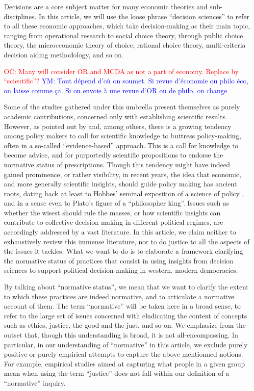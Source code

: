 \documentclass[preprint,11pt]{elsarticle}
\newcommand{\commentYM}[1]{\textcolor{blue}{YM: #1}}
\newcommand{\commentOC}[1]{\textcolor{red}{OC: #1}}
\begin{document}
\noindent Decisions are a core subject matter for many economic theories and sub-disciplines. In this article, we will use the loose phrase ``decision sciences'' to refer to all these economic approaches, which take decision-making as their main topic, ranging from operational research to social choice theory, through public choice theory, the microeconomic theory of choice, rational choice theory, multi-criteria decision aiding methodology, and so on.

\commentOC{Many will consider OR and MCDA as not a part of economy. Replace by “scientific”?}
\commentYM{Tout dépend d'où on soumet. Si revue d'économie ou philo éco, on laisse comme ça. Si on envoie à une revue d'OR ou de philo, on change}

Some of the studies gathered under this umbrella present themselves as purely academic contributions, concerned only with establishing scientific results. However, as pointed out by \cite{tsoukias_policy_2013} and\cite{marchi_evidence-based_2016}, among others, there is a growing tendency among policy makers to call for scientific knowledge to buttress policy-making, often in a so-called ``evidence-based'' approach. This is a call for knowledge to become advice, and for purportedly scientific propositions to endorse the normative status of prescriptions. Though this tendency might have indeed gained prominence, or rather visibility, in recent years, the idea that economic, and more generally scientific insights, should guide policy making has ancient roots, dating back at least to Hobbes’ seminal exposition of a science of policy \citep{skinner_reason_1996}, and in a sense even to Plato’s figure of a ``philosopher king''. Issues such as whether the wisest should rule the masses, or how scientific insights can contribute to collective decision-making in different political regimes, are accordingly addressed by a vast literature. In this article, we claim neither to exhaustively review this immense literature, nor to do justice to all the aspects of the issues it tackles. What we want to do is to elaborate a framework clarifying the normative status of practices that consist in using insights from decision sciences to support political decision-making in western, modern democracies.

By talking about ``normative status'', we mean that we want to clarify the extent to which these practices are indeed normative, and to articulate a normative account of them. The term ``normative'' will be taken here in a broad sense, to refer to the large set of issues concerned with eludicating the content of concepts such as ethics, justice, the good and the just, and so on. We emphasize from the outset that, though this understanding is broad, it is not all-encompassing. In particular, in our understanding of ``normative'' in this article, we exclude purely positive or purely empirical attempts to capture the above mentionned notions. For example, empirical studies aimed at capturing what people in a given group mean when using the term ``justice'' does not fall within our definition of a ``normative'' inquiry.
\end{document}
